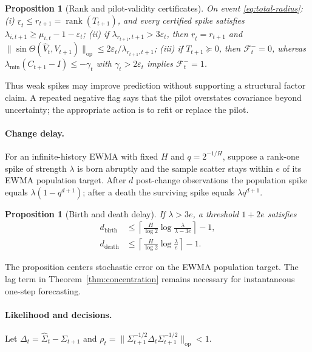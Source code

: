 \documentclass{article}
\newtheorem{proposition}[theorem]{Proposition}
\theoremstyle{definition}
\theoremstyle{remark}
\newcommand{\rank}{\operatorname{rank}}
\newcommand{\op}{\mathrm{op}}
\newcommand{\eps}{\varepsilon}
\begin{document}
\begin{proposition}[Rank and pilot-validity certificates]
\label{prop:certificates}
On event \eqref{eq:total-radius}:
(i) $\underline r_t\le r_{t+1}=\rank(T_{t+1})$, and every certified spike satisfies
$\lambda_{i,t+1}\ge\mu_{i,t}-1-\eps_t$;
(ii) if $\lambda_{r_{t+1},t+1}>3\eps_t$, then $\underline r_t=r_{t+1}$ and
$\|\sin\Theta(\widehat V_t,V_{t+1})\|_{\op}\le2\eps_t/\lambda_{r_{t+1},t+1}$;
(iii) if $T_{t+1}\succeq0$, then $\mathcal F_t^-=0$, whereas
$\lambda_{\min}(C_{t+1}-I)\le-\gamma_t$ with $\gamma_t>2\eps_t$ implies $\mathcal F_t^-=1$.
\end{proposition}

Thus weak spikes may improve prediction without supporting a structural factor claim. A repeated negative flag says that the pilot overstates covariance beyond uncertainty; the appropriate action is to refit or replace the pilot.

\paragraph{Change delay.}
For an infinite-history EWMA with fixed $H$ and $q=2^{-1/H}$, suppose a rank-one spike of strength $\lambda$ is born abruptly and the sample scatter stays within $e$ of its EWMA population target. After $d$ post-change observations the population spike equals $\lambda(1-q^{d+1})$; after a death the surviving spike equals $\lambda q^{d+1}$.

\begin{proposition}[Birth and death delay]
\label{prop:delay}
If $\lambda>3e$, a threshold $1+2e$ satisfies
\begin{align}
 d_{\mathrm{birth}}&\le\left\lceil\frac{H}{\log2}\log\frac{\lambda}{\lambda-3e}\right\rceil-1,\\
 d_{\mathrm{death}}&\le\left\lceil\frac{H}{\log2}\log\frac{\lambda}{e}\right\rceil-1.
\end{align}
\end{proposition}

The proposition centers stochastic error on the EWMA population target. The lag term in Theorem~\ref{thm:concentration} remains necessary for instantaneous one-step forecasting.

\paragraph{Likelihood and decisions.}
Let $\Delta_t=\widehat\Sigma_t-\Sigma_{t+1}$ and
$\rho_t=\|\Sigma_{t+1}^{-1/2}\Delta_t\Sigma_{t+1}^{-1/2}\|_{\op}<1$.
\end{document}
